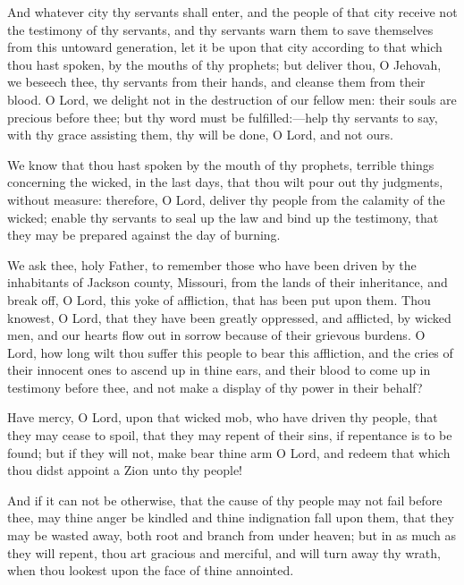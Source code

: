 					And whatever city thy servants shall enter, and the people of that city receive not the testimony of thy servants, and thy servants warn them to save themselves from this untoward generation, let it be upon that city according to that which thou hast spoken, by the mouths of thy prophets; but deliver thou, O Jehovah, we beseech thee, thy servants from their hands, and cleanse them from their blood. O Lord, we delight not in the destruction of our fellow men: their souls are precious before thee; but thy word must be fulfilled:---help thy servants to say, with thy grace assisting them, thy will be done, O Lord, and not ours.

					We know that thou hast spoken by the mouth of thy prophets, terrible things concerning the wicked, in the last days, that thou wilt pour out thy judgments, without measure: therefore, O Lord, deliver thy people from the calamity of the wicked; enable thy servants to seal up the law and bind up the testimony, that they may be prepared against the day of burning.

					We ask thee, holy Father, to remember those who have been driven by the inhabitants of Jackson county, Missouri, from the lands of their inheritance, and break off, O Lord, this yoke of affliction, that has been put upon them. Thou knowest, O Lord, that they have been greatly oppressed, and afflicted, by wicked men, and our hearts flow out in sorrow because of their grievous burdens. O Lord, how long wilt thou suffer this people to bear this affliction, and the cries of their innocent ones to ascend up in thine ears, and their blood to come up in testimony before thee, and not make a display of thy power in their behalf?

					Have mercy, O Lord, upon that wicked mob, who have driven thy people, that they may cease to spoil, that they may repent of their sins, if repentance is to be found; but if they will not, make bear thine arm O Lord, and redeem that which thou didst appoint a Zion unto thy people!

					And if it can not be otherwise, that the cause of thy people may not fail before thee, may thine anger be kindled and thine indignation fall upon them, that they may be wasted away, both root and branch from under heaven; but in as much as they will repent, thou art gracious and merciful, and will turn away thy wrath, when thou lookest upon the face of thine annointed.

